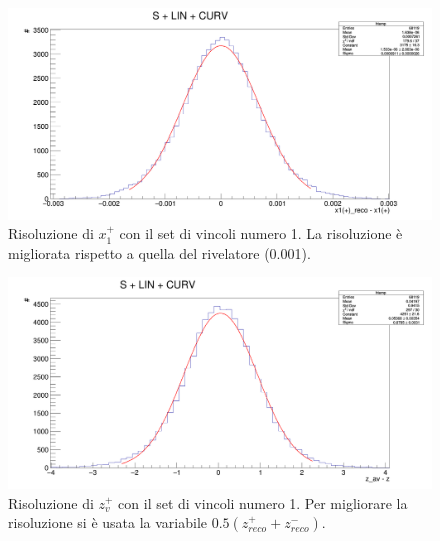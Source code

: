 \documentclass[8pt]{extarticle}
\begin{document}
\begin{figure}
	\begin{center}
		\includegraphics[scale=0.25]{set_1_x} 
		\caption{Risoluzione di $x_1^+$ con il set di vincoli numero 1. La risoluzione è migliorata rispetto a quella del rivelatore (0.001).}
		\label{fig:set_1_x}
	\end{center}
\end{figure}

\begin{figure}
	\begin{center}
		\includegraphics[scale=0.25]{set_1_z} 
		\caption{Risoluzione di $z_v^+$ con il set di vincoli numero 1. Per migliorare la risoluzione si è usata la variabile $0.5(z^+_{reco}+z^-_{reco})$.}
		\label{fig:set_1_z}
	\end{center}
\end{figure}
\end{document}
